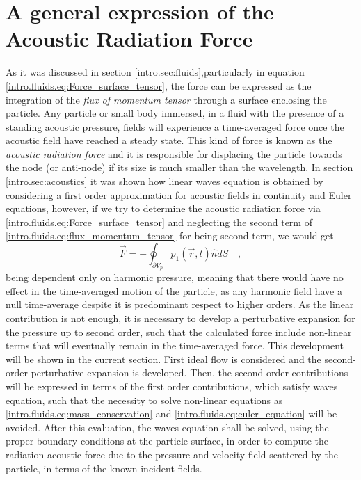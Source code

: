 \section{A general expression of the Acoustic Radiation Force}\label{intro.sec:arf}
As it was discussed in section \ref{intro.sec:fluids},particularly in equation \ref{intro.fluids.eq:Force_surface_tensor}, the force can be expressed as the integration of the \textit{flux of momentum tensor} through a surface enclosing the particle. Any particle or small body immersed, in a fluid with the presence of a standing acoustic pressure, fields will experience a time-averaged force once the acoustic field have reached a steady state. This kind of force is known as the \textit{acoustic radiation force} and it is responsible for displacing the particle towards the node (or anti-node) if its size is much smaller than the wavelength. In section \ref{intro.sec:acoustics} it was shown how linear waves equation is obtained by considering a first order approximation for acoustic fields in continuity and Euler equations, however, if we try to determine the acoustic radiation force via \ref{intro.fluids.eq:Force_surface_tensor} and neglecting the second term of \ref{intro.fluids.eq:flux_momentum_tensor} for being second term, we would get
\begin{equation}\label{intro.arf.eq:Force_pressure}
    \vec F = -\oint_{\partial V_p} p_1(\vec r,t) \hat n dS \quad, 
\end{equation}
being dependent only on harmonic pressure, meaning that there would have no effect in the time-averaged motion of the particle, as any harmonic field have a null time-average despite it is predominant respect to higher orders. As the linear contribution is not enough, it is necessary to develop a perturbative expansion for the pressure up to second order, such that the calculated force include non-linear terms that will eventually remain in the time-averaged force. This development will be shown in the current section. First ideal flow is considered and the second-order perturbative expansion is developed. Then, the second order contributions will be expressed in terms of the first order contributions, which satisfy waves equation, such that the necessity to solve non-linear equations as \ref{intro.fluids.eq:mass_conservation} and \ref{intro.fluids.eq:euler_equation} will be avoided. After this evaluation, the waves equation shall be solved, using the proper boundary conditions at the particle surface, in order to compute the radiation acoustic force due to the pressure and velocity field scattered by the particle, in terms of the known incident fields.
